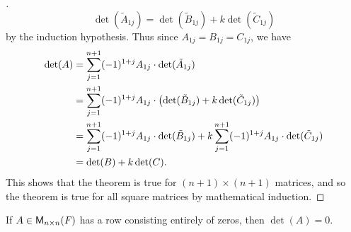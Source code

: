 \begin{proof}[]
	\[
		\det(\tilde{A}_{1 j}) = \det(\tilde{B}_{1 j}) + k \det(\tilde{C}_{1 j})
	\]
	by the induction hypothesis.
	Thus since \(A_{1 j} = B_{1 j} = C_{1 j}\), we have
	\begin{align*}
		\det(A) & = \sum_{j = 1}^{n + 1} (-1)^{1 + j} A_{1 j} \cdot \det(\tilde{A}_{1 j})                                                                           \\
		        & = \sum_{j = 1}^{n + 1} (-1)^{1 + j} A_{1 j} \cdot \left\lparen\det(\tilde{B}_{1 j}) + k \det(\tilde{C}_{1 j})\right\rparen                                            \\
		        & = \sum_{j = 1}^{n + 1} (-1)^{1 + j} A_{1 j} \cdot \det(\tilde{B}_{1 j}) + k \sum_{j = 1}^{n + 1} (-1)^{1 + j} A_{1 j} \cdot \det(\tilde{C}_{1 j}) \\
		        & = \det(B) + k \det(C).
	\end{align*}
	This shows that the theorem is true for \((n + 1) \times (n + 1)\) matrices, and so the theorem is true for all square matrices by mathematical induction.
\end{proof}

\begin{cor}\label{4.2.4}
	If \(A \in \ms[n][n][\F]\) has a row consisting entirely of zeros, then \(\det(A) = 0\).
\end{cor}

